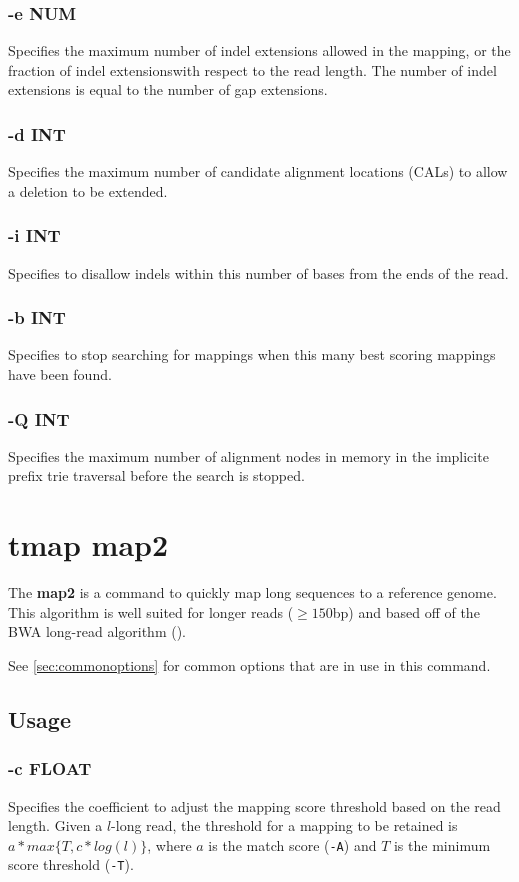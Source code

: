 \documentclass[a4paper,12pt]{book}
\newcommand{\TT}[1]{{\tt #1}} %
\newcommand{\BF}[1]{{\bf #1}} %
\begin{document}
\subsubsection{-e NUM}
Specifies the maximum number of indel extensions allowed in the mapping, or the fraction of indel extensionswith respect to the read length.
The number of indel extensions is equal to the number of gap extensions.

\subsubsection{-d INT}
Specifies the maximum number of candidate alignment locations (CALs) to allow a deletion to be extended.

\subsubsection{-i INT}
Specifies to disallow indels within this number of bases from the ends of the read.

\subsubsection{-b INT}
Specifies to stop searching for mappings when this many best scoring mappings have been found.

\subsubsection{-Q INT}
Specifies the maximum number of alignment nodes in memory in the implicite prefix trie traversal before the search is stopped.

\section{tmap map2}
\label{sec:map2}
The \BF{map2} is a command to quickly map long sequences to a reference genome.
This algorithm is well suited for longer reads ($\geq 150$bp) and based off of the BWA long-read algorithm (\cite{BWA-long}).

See \autoref{sec:commonoptions} for common options that are in use in this command.

\subsection{Usage}

\subsubsection{-c FLOAT}
Specifies the coefficient to adjust the mapping score threshold based on the read length.
Given a $l$-long read, the threshold for a mapping to be retained is $a*max\{T,c*log(l)\}$, where $a$ is the match score (\TT{-A}) and $T$ is the minimum score threshold (\TT{-T}).
\end{document}
